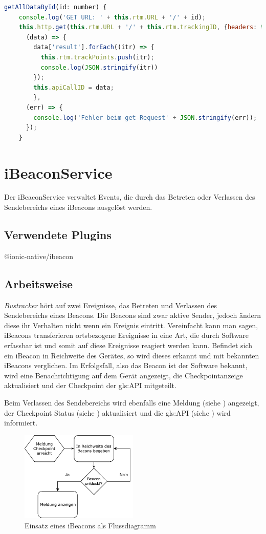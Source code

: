 \begin{lstlisting}[float, language=JavaScript, caption= Rückgabe aller gültigen Positionsdaten der jeweiligen TrackingID , label=lst:APIService]
getAllDataById(id: number) {
    console.log('GET URL: ' + this.rtm.URL + '/' + id);
    this.http.get(this.rtm.URL + '/' + this.rtm.trackingID, {headers: this.headers}).subscribe(
      (data) => {
        data['result'].forEach((itr) => {
          this.rtm.trackPoints.push(itr);
          console.log(JSON.stringify(itr))
        });
        this.apiCallID = data;
        },
      (err) => {
        console.log('Fehler beim get-Request' + JSON.stringify(err));
      });
    }
\end{lstlisting}

\section{iBeaconService}
\label{srv:iBeaconService}
Der iBeaconService verwaltet Events, die durch das Betreten oder Verlassen des Sendebereichs eines iBeacons ausgelöst werden.
\subsection{Verwendete Plugins}
@ionic-native/ibeacon \cite{iBeaconPluginDoku}
\subsection{Arbeitsweise}
\emph{Bustracker} hört auf zwei Ereignisse, das Betreten und Verlassen des Sendebereichs eines Beacons. Die Beacons sind zwar aktive Sender, jedoch ändern diese ihr Verhalten nicht wenn ein Ereignis eintritt.
Vereinfacht kann man sagen, iBeacons transferieren ortsbezogene Ereignisse in eine Art, die durch Software erfassbar ist und somit auf diese Ereignisse reagiert werden kann. 
Befindet sich ein iBeacon in Reichweite des Gerätes, so wird dieses erkannt und mit bekannten iBeacons verglichen. Im Erfolgsfall, also das Beacon ist der Software bekannt, wird eine Benachrichtigung auf dem Gerät angezeigt, die  Checkpointanzeige aktualisiert und der Checkpoint der \gls{gls:API} mitgeteilt.

Beim Verlassen des Sendebereichs wird ebenfalls eine Meldung (siehe ) angezeigt, der Checkpoint Status (siehe ) aktualisiert und die \gls{gls:API} (siehe ) wird informiert.

	\begin{figure}[htbp] 
  \centering
     \includegraphics[width=0.5\textwidth]{images/beaconflowchart.pdf}
  \caption{Einsatz eines iBeacons als Flussdiagramm}
  \label{fig:Beaconflowchart}
\end{figure}

